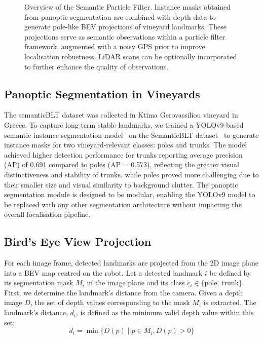 \documentclass[letterpaper, 10 pt, conference]{ieeeconf}
\begin{document}
\begin{figure}[t]
  \centering
  
  \caption{Overview of the Semantic Particle Filter. Instance masks obtained from panoptic segmentation are combined with depth data to generate pole-like BEV projections of vineyard landmarks. These projections serve as semantic observations within a particle filter framework, augmented with a noisy GPS prior to improve localisation robustness. LiDAR scans can be optionally incorporated to further enhance the quality of observations.
}
  \label{fig:overall}
\end{figure}

\subsection{Panoptic Segmentation in Vineyards}
The semanticBLT dataset was collected in Ktima Gerovassiliou vineyard in Greece. To capture long-term stable landmarks, we trained a YOLOv9-based semantic instance segmentation model~\cite{yolov9} on the SemanticBLT dataset~\cite{semanticblt_dataset} to generate instance masks for two vineyard-relevant classes: poles and trunks. The model achieved higher detection performance for trunks reporting average precision (AP) of 0.691 compared to poles (AP = 0.573), reflecting the greater visual distinctiveness and stability of trunks, while poles proved more challenging due to their smaller size and visual similarity to background clutter. The panoptic segmentation module is designed to be modular, enabling the YOLOv9 model to be replaced with any other segmentation architecture without impacting the overall localisation pipeline.

\subsection{Bird's Eye View Projection}
For each image frame, detected landmarks are projected from the 2D image plane into a BEV map centred on the robot. Let a detected landmark $i$ be defined by its segmentation mask $M_i$ in the image plane and its class $c_i \in \{\text{pole, trunk}\}$. First, we determine the landmark's distance from the camera. Given a depth image $D$, the set of depth values corresponding to the mask $M_i$ is extracted. The landmark's distance, $d_i$, is defined as the minimum valid depth value within this set:
\begin{equation}
    d_i = \min \{D(p) \mid p \in M_i, D(p) > 0\}
\end{equation}
\end{document}
